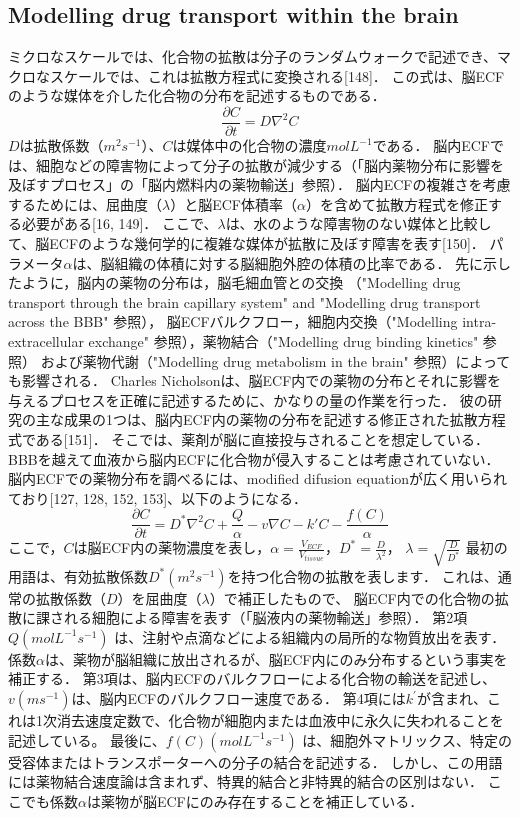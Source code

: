 \documentclass[11pt,a4paper]{jsarticle}
\begin{document}
\subsection{Modelling drug transport within the brain}
ミクロなスケールでは、化合物の拡散は分子のランダムウォークで記述でき、マクロなスケールでは、これは拡散方程式に変換される[148]．
この式は、脳ECFのような媒体を介した化合物の分布を記述するものである．
\begin{equation}
    \frac{\partial{C}}{\partial{t}}=D\nabla^2 C
\end{equation}
$D$は拡散係数（$m^2 s^{-1}$）、$C$は媒体中の化合物の濃度$mol L^{-1}$である．
脳内ECFでは、細胞などの障害物によって分子の拡散が減少する（「脳内薬物分布に影響を及ぼすプロセス」の「脳内燃料内の薬物輸送」参照）．
脳内ECFの複雑さを考慮するためには、屈曲度（$\lambda$）と脳ECF体積率（$\alpha$）を含めて拡散方程式を修正する必要がある[16, 149]．
ここで、$\lambda$は、水のような障害物のない媒体と比較して、脳ECFのような幾何学的に複雑な媒体が拡散に及ぼす障害を表す[150]．
パラメータ$\alpha$は、脳組織の体積に対する脳細胞外腔の体積の比率である．
先に示したように，脳内の薬物の分布は，脳毛細血管との交換
（"Modelling drug transport through the brain capillary system" and "Modelling drug transport across the BBB" 参照），
脳ECFバルクフロー，細胞内交換（"Modelling intra-extracellular exchange" 参照），薬物結合（"Modelling drug binding kinetics" 参照）
および薬物代謝（"Modelling drug metabolism in the brain" 参照）によっても影響される．
Charles Nicholsonは、脳ECF内での薬物の分布とそれに影響を与えるプロセスを正確に記述するために、かなりの量の作業を行った．
彼の研究の主な成果の1つは、脳内ECF内の薬物の分布を記述する修正された拡散方程式である[151]．
そこでは、薬剤が脳に直接投与されることを想定している．
BBBを越えて血液から脳内ECFに化合物が侵入することは考慮されていない．
脳内ECFでの薬物分布を調べるには、modified difusion equationが広く用いられており[127, 128, 152, 153]、以下のようになる．
\begin{equation}
    \frac{\partial{C}}{\partial{t}}=D^{\ast}\nabla^2 C+\frac{Q}{\alpha}-v \nabla C-k'C-\frac{f(C)}{\alpha}
\end{equation}
ここで，$C$は脳ECF内の薬物濃度を表し，$\alpha=\frac{V_{ECF}}{V_{tissue}}$，$D^{\ast}=\frac{D}{\lambda^2}$，
$\lambda=\sqrt{\frac{D}{D^{\ast}}}$
最初の用語は、有効拡散係数$D^{\ast}(m^2 s^{-1})$を持つ化合物の拡散を表します．
これは、通常の拡散係数（$D$）を屈曲度（$\lambda$）で補正したもので、
脳ECF内での化合物の拡散に課される細胞による障害を表す（「脳液内の薬物輸送」参照）．
第2項$Q(mol L^{-1}s^{-1})$ は、注射や点滴などによる組織内の局所的な物質放出を表す．
係数$\alpha$は、薬物が脳組織に放出されるが、脳ECF内にのみ分布するという事実を補正する．
第3項は、脳内ECFのバルクフローによる化合物の輸送を記述し、$v(m s^{-1})$は、脳内ECFのバルクフロー速度である．
第4項には$k^{\prime}$が含まれ、これは1次消去速度定数で、化合物が細胞内または血液中に永久に失われることを記述している。
最後に、$f(C) (mol L^{-1} s^{-1})$ は、細胞外マトリックス、特定の受容体またはトランスポーターへの分子の結合を記述する．
しかし、この用語には薬物結合速度論は含まれず、特異的結合と非特異的結合の区別はない．
ここでも係数$\alpha$は薬物が脳ECFにのみ存在することを補正している．
\end{document}
